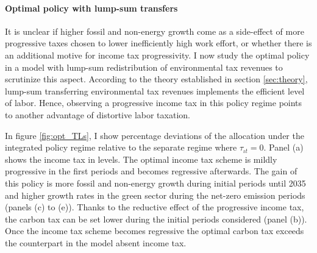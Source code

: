 \paragraph{Optimal policy with lump-sum transfers}\label{subsec:tls}

 It is unclear if higher fossil and non-energy growth come as a side-effect of more progressive taxes chosen to lower inefficiently high work effort, or whether there is an additional motive for income tax progressivity. I now study the optimal policy in a model with lump-sum redistribution of environmental tax revenues to scrutinize this aspect.
 According to the theory established in section \ref{sec:theory}, lump-sum transferring environmental tax revenues implements the efficient level of labor. 
Hence, observing a progressive income tax in this policy regime points to another advantage of distortive labor taxation. 

In figure \ref{fig:opt_TLs}, I show percentage deviations of the allocation under the integrated policy regime relative to the separate regime where $\tau_{\iota t}=0$. 
Panel (a) shows the income tax in levels.
The optimal income tax scheme is mildly progressive in the first periods and becomes regressive afterwards. The gain of this policy is more fossil and non-energy growth during initial periods until 2035  and higher growth rates in the green sector during the net-zero emission periods (panels (c) to (e)). %
Thanks to the reductive effect of the progressive income tax, the carbon tax can be set lower during the initial periods considered (panel (b)). Once the income tax scheme becomes regressive the optimal carbon tax exceeds the counterpart in the model absent income tax. 

